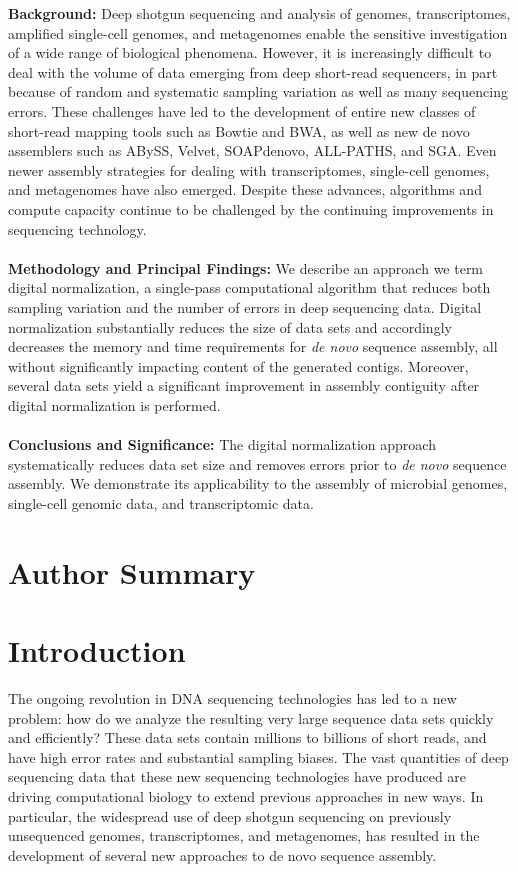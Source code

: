 \documentclass[10pt,draft]{article}
\begin{document}
{\bf Background:} Deep shotgun sequencing and analysis of genomes,
transcriptomes, amplified single-cell genomes, and metagenomes enable
the sensitive investigation of a wide range of biological
phenomena. However, it is increasingly difficult to deal with the volume of data
emerging from deep short-read sequencers, in part because of random
and systematic sampling variation as well as many sequencing errors.
These challenges have led to the development of entire new classes of
short-read mapping tools such as Bowtie and BWA, as well as new de
novo assemblers such as ABySS, Velvet, SOAPdenovo, ALL-PATHS, and SGA.
Even newer assembly strategies for dealing with transcriptomes,
single-cell genomes, and metagenomes have also emerged.  Despite these
advances, algorithms and compute capacity continue to be challenged by
the continuing improvements in sequencing technology.
\\
\\
{\bf Methodology and Principal Findings:} We describe an approach we term
digital normalization, a single-pass computational algorithm that
reduces both sampling variation and the number of errors in deep sequencing data. Digital normalization substantially
reduces the size of data sets and accordingly decreases the memory and time
requirements for {\em de novo} sequence assembly, all without significantly
impacting content of the generated contigs.  Moreover, several data sets
yield a significant improvement in assembly contiguity after digital normalization
is performed.
\\
\\
{\bf Conclusions and Significance:} The digital normalization approach
systematically reduces data set size and removes errors prior to {\em
de novo} sequence assembly.  We demonstrate its
applicability to the assembly of microbial genomes, single-cell
genomic data, and transcriptomic data.

\section*{Author Summary}

\section*{Introduction}

The ongoing revolution in DNA sequencing technologies has led to a new
problem: how do we analyze the resulting very large sequence data sets
quickly and efficiently? These data sets contain millions to billions
of short reads, and have high error rates and substantial sampling
biases.  The vast quantities of deep sequencing data that
these new sequencing technologies have produced are driving
computational biology to extend previous approaches in new ways.  In
particular, the widespread use of deep shotgun sequencing on
previously unsequenced genomes, transcriptomes, and metagenomes, has
resulted in the development of several new approaches to de novo
sequence assembly.
\end{document}
